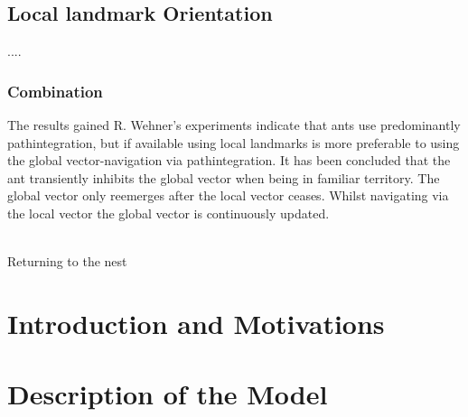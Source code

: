\documentclass[11pt]{article}
\begin{document}
\subsection{Local landmark Orientation}
....
\newpage

\subsubsection{Combination} \label{Sec:Combination}
The results gained R. Wehner's experiments indicate that ants use predominantly pathintegration, but if available using local landmarks is more preferable to using the global vector-navigation via pathintegration. It has been concluded that the ant transiently inhibits the global vector when being in familiar territory. The global vector only reemerges after the local vector ceases. Whilst navigating via the local vector the global vector is continuously updated.
\\ \

\begin{algorithm}[H]

\caption{Returning to the nest}
\end{algorithm}















\newpage
\section{Introduction and Motivations}


\section{Description of the Model}
\end{document}
